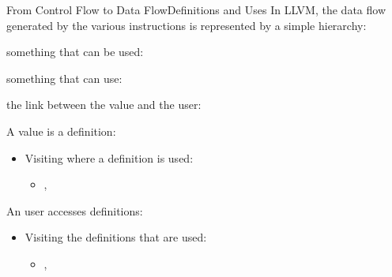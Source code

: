 \begin{frame}{From Control Flow to Data Flow}{Definitions and Uses}
In LLVM, the data flow generated by the various instructions is represented by a simple hierarchy:

\begin{description}[valueMMM]
\item[value] something that can be used: 
\item[user] something that can use: 
\item[use] the link between the \alert{value} and the \alert{user}: 
\end{description}
\medskip
A value is a \alert{definition}:

\begin{itemize}
\item Visiting where a definition is used:
\begin{itemize}
\item {}, 
\end{itemize}
\end{itemize}
\medskip
An user accesses \alert{definitions}:

\begin{itemize}
\item Visiting the definitions that are used:
\begin{itemize}
\item {}, 
\end{itemize}
\end{itemize}
\medskip

\end{frame}



